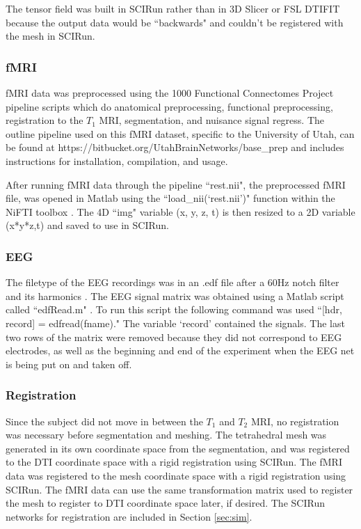 The tensor field was built in SCIRun rather than in 3D Slicer \cite{ref:slicer} or FSL DTIFIT because the output data would be ``backwards" and couldn't be registered with the mesh in SCIRun.

\newpage

\subsubsection{fMRI}
\label{sec:fmripre}

fMRI data was preprocessed using the 1000 Functional Connectomes Project pipeline scripts \cite{ref:fcon} which do anatomical preprocessing, functional preprocessing, registration to the $T_1$ MRI, segmentation, and nuisance signal regress. The outline pipeline used on this fMRI dataset, specific to the University of Utah, can be found at https://bitbucket.org/UtahBrainNetworks/base\_prep and includes instructions for installation, compilation, and usage.  

After running fMRI data through the pipeline ``rest.nii", the preprocessed fMRI file, was opened in Matlab using the ``load\_nii(`rest.nii')" function within the NiFTI toolbox \cite{ref:nifti}. The 4D ``img" variable (x, y, z, t) is then resized to a 2D variable (x*y*z,t) and saved to use in SCIRun. 

\subsubsection{EEG}

The filetype of the EEG recordings was in an .edf file after a 60Hz notch filter and its harmonics \cite{ref:filter}. The EEG signal matrix was obtained using a Matlab script called ``edfRead.m" \cite{ref:edfread}. To run this script the following command was used ``[hdr, record] = edfread(fname)." The variable `record' contained the signals. The last two rows of the matrix were removed because they did not correspond to EEG electrodes, as well as the beginning and end of the experiment when the EEG net is being put on and taken off. 

\subsubsection{Registration}

Since the subject did not move in between the $T_1$ and $T_2$ MRI, no registration was necessary before segmentation and meshing. The tetrahedral mesh was generated in its own coordinate space from the segmentation, and was registered to the DTI coordinate space with a rigid registration using SCIRun. The fMRI data was registered to the mesh coordinate space with a rigid registration using SCIRun. The fMRI data can use the same transformation matrix used to register the mesh to register to DTI coordinate space later, if desired. The SCIRun networks for registration are included in Section \ref{sec:sim}.

